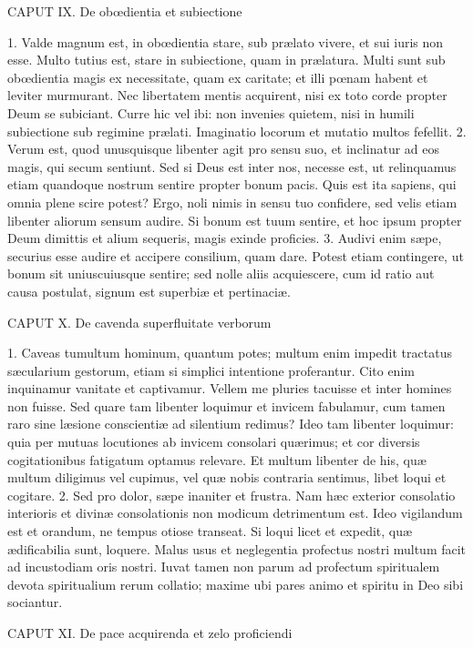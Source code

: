 CAPUT IX.
De obœdientia et subiectione

1. Valde magnum est, in obœdientia stare, sub prælato vivere, et sui iuris non esse. Multo tutius est, stare in subiectione, quam in prælatura. Multi sunt sub obœdientia magis ex necessitate, quam ex caritate; et illi pœnam habent et leviter murmurant. Nec libertatem mentis acquirent, nisi ex toto corde propter Deum se subiciant. Curre hic vel ibi: non invenies quietem, nisi in humili subiectione sub regimine prælati. Imaginatio locorum et mutatio multos fefellit.
2. Verum est, quod unusquisque libenter agit pro sensu suo, et inclinatur ad eos magis, qui secum sentiunt. Sed si Deus est inter nos, necesse est, ut relinquamus etiam quandoque nostrum sentire propter bonum pacis. Quis est ita sapiens, qui omnia plene scire potest? Ergo, noli nimis in sensu tuo confidere, sed velis etiam libenter aliorum sensum audire. Si bonum est tuum sentire, et hoc ipsum propter Deum dimittis et alium sequeris, magis exinde proficies.
3. Audivi enim sæpe, securius esse audire et accipere consilium, quam dare. Potest etiam contingere, ut bonum sit uniuscuiusque sentire; sed nolle aliis acquiescere, cum id ratio aut causa postulat, signum est superbiæ et pertinaciæ.


CAPUT X.
De cavenda superfluitate verborum

1. Caveas tumultum hominum, quantum potes; multum enim impedit tractatus sæcularium gestorum, etiam si simplici intentione proferantur. Cito enim inquinamur vanitate et captivamur. Vellem me pluries tacuisse et inter homines non fuisse. Sed quare tam libenter loquimur et invicem fabulamur, cum tamen raro sine læsione conscientiæ ad silentium redimus? Ideo tam libenter loquimur: quia per mutuas locutiones ab invicem consolari quærimus; et cor diversis cogitationibus fatigatum optamus relevare. Et multum libenter de his, quæ multum diligimus vel cupimus, vel quæ nobis contraria sentimus, libet loqui et cogitare.
2. Sed pro dolor, sæpe inaniter et frustra. Nam hæc exterior consolatio interioris et divinæ consolationis non modicum detrimentum est. Ideo vigilandum est et orandum, ne tempus otiose transeat. Si loqui licet et expedit, quæ ædificabilia sunt, loquere. Malus usus et neglegentia profectus nostri multum facit ad incustodiam oris nostri. Iuvat tamen non parum ad profectum spiritualem devota spiritualium rerum collatio; maxime ubi pares animo et spiritu in Deo sibi sociantur.


CAPUT XI.
De pace acquirenda et zelo proficiendi

